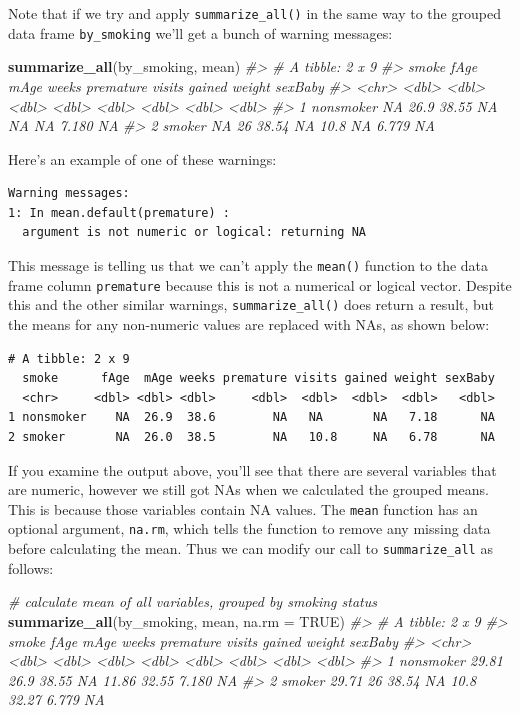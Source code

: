 \documentclass[]{book}
\newenvironment{Shaded}{\begin{snugshade}}{\end{snugshade}}
\newcommand{\CommentTok}[1]{\textcolor[rgb]{0.56,0.35,0.01}{\textit{#1}}}
\newcommand{\DataTypeTok}[1]{\textcolor[rgb]{0.13,0.29,0.53}{#1}}
\newcommand{\KeywordTok}[1]{\textcolor[rgb]{0.13,0.29,0.53}{\textbf{#1}}}
\newcommand{\NormalTok}[1]{#1}
\newcommand{\OtherTok}[1]{\textcolor[rgb]{0.56,0.35,0.01}{#1}}
\theoremstyle{definition}
\theoremstyle{definition}
\theoremstyle{definition}
\theoremstyle{remark}
\begin{document}
Note that if we try and apply \texttt{summarize\_all()} in the same way
to the grouped data frame \texttt{by\_smoking} we'll get a bunch of
warning messages:

\begin{Shaded}
\begin{Highlighting}[]
\KeywordTok{summarize_all}\NormalTok{(by_smoking, mean)}
\CommentTok{#> # A tibble: 2 x 9}
\CommentTok{#>   smoke      fAge  mAge weeks premature visits gained weight sexBaby}
\CommentTok{#>   <chr>     <dbl> <dbl> <dbl>     <dbl>  <dbl>  <dbl>  <dbl>   <dbl>}
\CommentTok{#> 1 nonsmoker    NA  26.9 38.55        NA   NA       NA  7.180      NA}
\CommentTok{#> 2 smoker       NA  26   38.54        NA   10.8     NA  6.779      NA}
\end{Highlighting}
\end{Shaded}

Here's an example of one of these warnings:

\begin{verbatim}
Warning messages:
1: In mean.default(premature) :
  argument is not numeric or logical: returning NA
\end{verbatim}

This message is telling us that we can't apply the \texttt{mean()}
function to the data frame column \texttt{premature} because this is not
a numerical or logical vector. Despite this and the other similar
warnings, \texttt{summarize\_all()} does return a result, but the means
for any non-numeric values are replaced with NAs, as shown below:

\begin{verbatim}
# A tibble: 2 x 9
  smoke      fAge  mAge weeks premature visits gained weight sexBaby
  <chr>     <dbl> <dbl> <dbl>     <dbl>  <dbl>  <dbl>  <dbl>   <dbl>
1 nonsmoker    NA  26.9  38.6        NA   NA       NA   7.18      NA
2 smoker       NA  26.0  38.5        NA   10.8     NA   6.78      NA
\end{verbatim}

If you examine the output above, you'll see that there are several
variables that are numeric, however we still got NAs when we calculated
the grouped means. This is because those variables contain NA values.
The \texttt{mean} function has an optional argument, \texttt{na.rm},
which tells the function to remove any missing data before calculating
the mean. Thus we can modify our call to \texttt{summarize\_all} as
follows:

\begin{Shaded}
\begin{Highlighting}[]
\CommentTok{# calculate mean of all variables, grouped by smoking status}
\KeywordTok{summarize_all}\NormalTok{(by_smoking, mean, }\DataTypeTok{na.rm =} \OtherTok{TRUE}\NormalTok{)}
\CommentTok{#> # A tibble: 2 x 9}
\CommentTok{#>   smoke      fAge  mAge weeks premature visits gained weight sexBaby}
\CommentTok{#>   <chr>     <dbl> <dbl> <dbl>     <dbl>  <dbl>  <dbl>  <dbl>   <dbl>}
\CommentTok{#> 1 nonsmoker 29.81  26.9 38.55        NA  11.86  32.55  7.180      NA}
\CommentTok{#> 2 smoker    29.71  26   38.54        NA  10.8   32.27  6.779      NA}
\end{Highlighting}
\end{Shaded}
\end{document}
